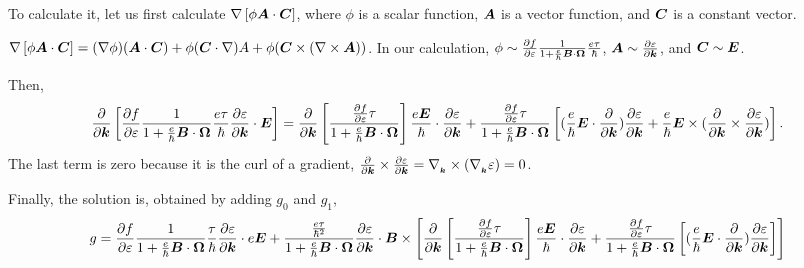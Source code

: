 \documentclass{report}
\renewcommand\vec[1]{\ensuremath\boldsymbol{#1}} %
\begin{document}
To calculate it, let us first calculate $\nabla \left[\phi \vec{A}\cdot\vec{C}\right]$, where $\phi$ is a scalar function, $\vec{A}$ is a vector function, and $\vec{C}$ is a constant vector.

$\nabla \left[\phi \vec{A}\cdot\vec{C}\right] = (\nabla \phi) (\vec{A}\cdot\vec{C}) + \phi (\vec{C}\cdot \nabla){A} + \phi (\vec{C}\times(\nabla\times\vec{A})) $. In our calculation, $\phi \sim \frac{\partial f} {\partial \varepsilon}\frac{1}{1 + \frac{e}{\hbar} \vec{B}\cdot\vec{\Omega}}
\frac{e \tau}{\hbar}$, $\vec{A} \sim \frac{\partial \varepsilon}{\partial \vec{k}}$, and $\vec{C} \sim \vec{E}$.

Then, $$\frac{\partial}{\partial \vec{k}} \left[ \frac{\partial f} {\partial \varepsilon}\frac{1}{1 + \frac{e}{\hbar} \vec{B}\cdot\vec{\Omega}}
\frac{e \tau}{\hbar} \frac{\partial \varepsilon}{\partial \vec{k}}\cdot \vec{E} \right] = \frac{\partial}{\partial \vec{k}} \left[ \frac{\frac{\partial f} {\partial \varepsilon} \tau}{1 + \frac{e}{\hbar} \vec{B}\cdot\vec{\Omega}}
\right] \frac{e \vec{E}}{\hbar} \cdot \frac{\partial \varepsilon}{\partial \vec{k}} + \frac{\frac{\partial f} {\partial \varepsilon} \tau}{1 + \frac{e}{\hbar} \vec{B}\cdot\vec{\Omega}} \left[(\frac{e}{\hbar} \vec{E}\cdot \frac{\partial }{\partial \vec{k}} )\frac{\partial \varepsilon}{\partial \vec{k}} + \frac{e}{\hbar} \vec{E}\times (\frac{\partial }{\partial \vec{k}} \times \frac{\partial \varepsilon}{\partial \vec{k}}) \right].$$
The last term is zero because it is the curl of a gradient, $\frac{\partial }{\partial \vec{k}} \times \frac{\partial \varepsilon}{\partial \vec{k}} = \nabla_{_{\vec{k}}} \times (\nabla_{_{\vec{k}}} \varepsilon) = 0$.

Finally, the solution is, obtained by adding $g_0$ and $g_1$,
\begin{equation}\label{Eq:app:gnonzeroE}
	g = \frac{\partial f} {\partial \varepsilon}\frac{1}{1 + \frac{e}{\hbar} \vec{B}\cdot\vec{\Omega}}
	\frac{\tau}{\hbar} \frac{\partial \varepsilon}{\partial \vec{k}}\cdot e \vec{E} + \frac{\frac{e \tau}{\hbar^2} }{1 + \frac{e}{\hbar} \vec{B}\cdot\vec{\Omega}} \frac{\partial \varepsilon}{\partial \vec{k}} \cdot \vec{B} \times \left[ \frac{\partial}{\partial \vec{k}} \left[ \frac{\frac{\partial f} {\partial \varepsilon} \tau}{1 + \frac{e}{\hbar} \vec{B}\cdot\vec{\Omega}}
	\right] \frac{e \vec{E}}{\hbar} \cdot \frac{\partial \varepsilon}{\partial \vec{k}} + \frac{\frac{\partial f} {\partial \varepsilon} \tau}{1 + \frac{e}{\hbar} \vec{B}\cdot\vec{\Omega}} \left[(\frac{e}{\hbar} \vec{E}\cdot \frac{\partial }{\partial \vec{k}} )\frac{\partial \varepsilon}{\partial \vec{k}} \right] \right]
\end{equation}
\end{document}
